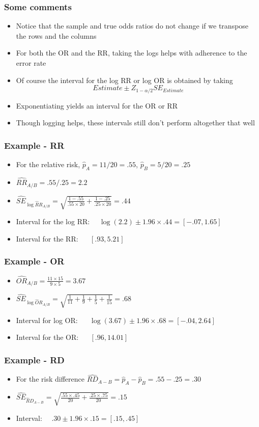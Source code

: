 \documentclass[aspectratio=169]{beamer}
\begin{document}
\begin{frame}\frametitle{Some comments}
  \begin{itemize}
  \item Notice that the sample and true odds ratios do not change if we
    transpose the rows and the columns
  \item For both the OR and the RR, taking the logs helps with adherence to the
    error rate
  \item Of course the interval for the log RR or log OR is obtained by taking 
    $$Estimate \pm Z_{1-\alpha/2}SE_{Estimate}$$
  \item Exponentiating yields an interval for the OR or RR
  \item Though logging helps, these intervals still don't perform
    altogether that well
  \end{itemize}
\end{frame}


\begin{frame}\frametitle{Example - RR}
  \begin{itemize}
  \item For the relative risk, $\hat p_A = 11 /20 = .55$, $\hat p_B = 5 / 20 = .25$
  \item $\hat{RR}_{A/B} = .55 / .25 = 2.2$
  \item $\hat{SE}_{\log \hat RR_{A/B}} = \sqrt{\frac{1 - .55}{.55\times20} + \frac{1 - .25}{.25\times 20}} = .44$
  \item Interval for the log RR: ~~$\log(2.2)\pm 1.96 \times .44 = [-.07, 1.65]$
  \item Interval for the RR: ~~ $[.93, 5.21]$
  \end{itemize}
\end{frame}

\begin{frame}\frametitle{Example - OR}
  \begin{itemize}
  \item $\hat{OR}_{A/B} = \frac{11\times 15}{9\times 5} = 3.67$
  \item $\hat{SE}_{\log \hat OR_{A/B}} = \sqrt{\frac{1}{11} + \frac{1}{9} + \frac{1}{5} + \frac{1}{15}} = .68$
  \item Interval for log OR: ~~ $\log(3.67) \pm 1.96 \times .68 = [-.04, 2.64]$
  \item Interval for the OR:  ~~ $[.96, 14.01]$
  \end{itemize}
\end{frame}

\begin{frame}\frametitle{Example - RD}
  \begin{itemize}
  \item For the risk difference $\hat{RD}_{A-B} = \hat p_A - \hat p_B = .55 - .25 = .30$
  \item $\hat{SE}_{\hat  RD_{A-B}} = \sqrt{\frac{.55\times .45}{20} + \frac{.25\times .75}{20}} = .15$
  \item Interval:~~ $.30 \pm 1.96 \times .15 = [.15, .45]$
  \end{itemize}
\end{frame}
\end{document}
